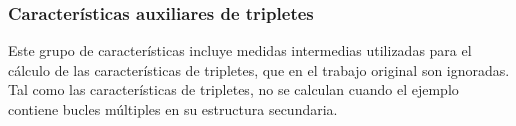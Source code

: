 %
%
\subsubsection{Características auxiliares de tripletes}
%
Este grupo de características incluye medidas intermedias utilizadas
para el cálculo de las características de tripletes, que en el trabajo
original \cite{xue} son ignoradas. Tal como las características de tripletes,
no se calculan cuando el ejemplo contiene bucles múltiples en su estructura
secundaria.
